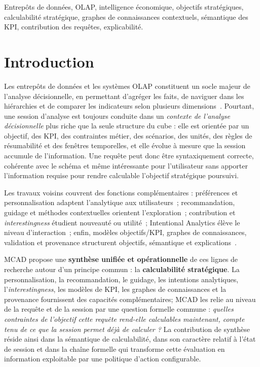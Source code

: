 \documentclass[journal]{IEEEtran}
\begin{document}
\begin{IEEEkeywords}
Entrepôts de données, OLAP, intelligence économique, objectifs stratégiques, calculabilité stratégique, graphes de connaissances contextuels, sémantique des KPI, contribution des requêtes, explicabilité.
\end{IEEEkeywords}

\section{Introduction}
\label{sec:intro}

Les entrepôts de données et les systèmes OLAP constituent un socle majeur de l'analyse décisionnelle, en permettant d'agréger les faits, de naviguer dans les hiérarchies et de comparer les indicateurs selon plusieurs dimensions~\cite{ChaudhuriDayal97,KimballRoss2013,ChenBI2012}. Pourtant, une session d'analyse est toujours conduite dans un \emph{contexte de l'analyse décisionnelle} plus riche que la seule structure du cube : elle est orientée par un objectif, des KPI, des contraintes métier, des scénarios, des unités, des règles de résumabilité et des fenêtres temporelles, et elle évolue à mesure que la session accumule de l'information. Une requête peut donc être syntaxiquement correcte, cohérente avec le schéma et même intéressante pour l'utilisateur sans apporter l'information requise pour rendre calculable l'objectif stratégique poursuivi.

Les travaux voisins couvrent des fonctions complémentaires : préférences et personnalisation adaptent l'analytique aux utilisateurs~\cite{GolfarelliRizziBiondi2011,JacobGunklachMaedche2025}; recommandation, guidage et méthodes contextuelles orientent l'exploration~\cite{AligonDSS2015,NegreRavatTeste2018,GunklachNadj2023,RoyContextOLAP2022}; contribution et \emph{interestingness} étudient nouveauté ou utilité~\cite{DjedainiEtAl2019,GkitsakisEtAl2024,ArenasExploratory2025}; Intentional Analytics élève le niveau d'interaction~\cite{VassiliadisMarcelRizzi2019,FranciaPredict2026}; enfin, modèles objectifs/KPI, graphes de connaissances, validation et provenance structurent objectifs, sémantique et explications~\cite{Pourshahid2014,MateTrujilloMylopoulos2017,RoldanGarciaEtAl2021,DiamantiniKPISurvey2025,HoganKGSurvey2021,ZhongKGC2024,W3CSHACL2017,W3CPROVO2013}.

MCAD propose une \textbf{synthèse unifiée et opérationnelle} de ces lignes de recherche autour d'un principe commun : la \textbf{calculabilité stratégique}. La personnalisation, la recommandation, le guidage, les intentions analytiques, l'\emph{interestingness}, les modèles de KPI, les graphes de connaissances et la provenance fournissent des capacités complémentaires; MCAD les relie au niveau de la requête et de la session par une question formelle commune : \emph{quelles contraintes de l'objectif cette requête rend-elle calculables maintenant, compte tenu de ce que la session permet déjà de calculer ?} La contribution de synthèse réside ainsi dans la sémantique de calculabilité, dans son caractère relatif à l'état de session et dans la chaîne formelle qui transforme cette évaluation en information exploitable par une politique d'action configurable.
\end{document}
